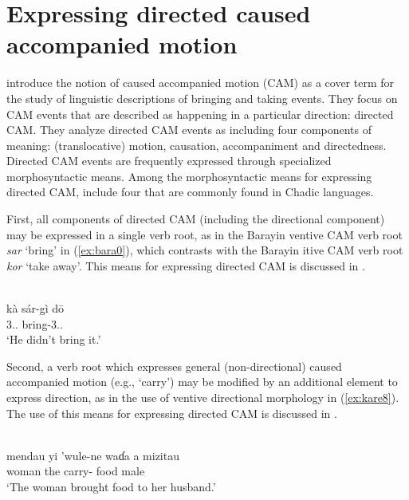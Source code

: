 \section{Expressing directed caused accompanied motion}

\citet{hellwigBringingTakingCrosslinguistic2022} introduce the notion of caused accompanied motion (CAM) as a cover term for the study of linguistic descriptions of bringing and taking events.  They focus on CAM events that are described as happening in a particular direction: directed CAM. They analyze directed CAM events as including four components of meaning: (translocative) motion, causation, accompaniment and directedness. Directed CAM events are frequently expressed through specialized morphosyntactic means. Among the morphosyntactic means for expressing directed CAM, \citet{hellwigBringingTakingCrosslinguistic2022} include four that are commonly found in Chadic languages. 

First, all components of directed CAM (including the directional component) may be expressed in a single verb root, as in the Barayin ventive CAM verb root \textit{sar} `bring' in (\ref{ex:bara0}), which contrasts with the Barayin itive CAM verb root \textit{kor} `take away'. This means for expressing directed CAM is discussed in .

\ea\label{ex:bara0}
 \\
\gll kà sár-gì dō \\
3.. bring-3..  \\
\glt `He didn't bring it.'
\z

Second, a verb root which expresses general (non-directional) caused accompanied motion (e.g., `carry') may be modified by an additional element to express direction, as in the use of ventive directional morphology in (\ref{ex:kare8}). The use of this means for expressing directed CAM is discussed in .

\ea\label{ex:kare8}
 \\
\gll mendau yi 'wule-ne waɗa a mizitau \\
woman the carry- food  male	\\
\glt `The woman brought food to her husband.'
\z 

